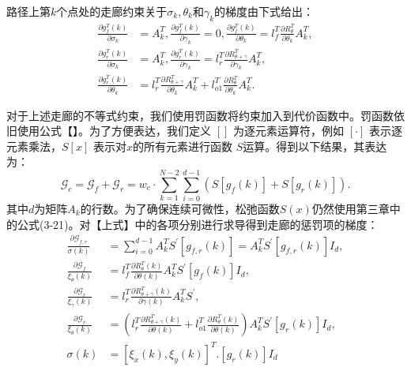 \documentclass[master,academic]{ysuthesis} %
\begin{document}
		路径上第$k$个点处的走廊约束关于$\sigma_k,\theta_k$和$\gamma_k$的梯度由下式给出：
		\begin{equation}
			\begin{aligned}
			\frac{\partial g_{f}^{T}(k)}{\partial \sigma _k}&=A_{k}^{T},\frac{\partial g_{f}^{T}(k)}{\partial \gamma _k}=0,\frac{\partial g_{f}^{T}(k)}{\partial \theta _k}=l_{f}^{T}\frac{\partial R_{\theta}^{T}}{\partial \theta _k}A_{k}^{T},\\
			\frac{\partial g_{r}^{T}(k)}{\partial \sigma _k}&=A_{k}^{T},\frac{\partial g_{r}^{T}(k)}{\partial \gamma _k}=l_{r}^{T}\frac{\partial R_{\theta +\gamma}^{T}}{\partial \gamma _k}A_{k}^{T},\\
			\frac{\partial g_{r}^{T}(k)}{\partial \theta _k}&=l_{r}^{T}\frac{\partial R_{\theta +\gamma}^{T}}{\partial \theta _k}A_{k}^{T}+l_{o1}^{T}\frac{\partial R_{\theta}^{T}}{\partial \theta _k}A_{k}^{T}.
			\end{aligned}
		\end{equation}

		对于上述走廊的不等式约束，我们使用罚函数将约束加入到代价函数中。罚函数依旧使用公式【】。为了方便表达，我们定义 \([]\) 为逐元素运算符，例如 \([\cdot]\) 表示逐元素乘法，\(S[x]\) 表示对$x$的所有元素进行函数 \(S\)运算。得到以下结果，其表达为：
		\begin{equation}
			\mathcal{G}_c =\mathcal{G}_{f}+\mathcal{G}_{r}=w_{c}\cdot \sum_{k=1}^{N-2}\sum_{i=0}^{d-1}(S[g_f(k)] + S[g_r(k)]).\label{20}
		\end{equation}
		其中$d$为矩阵$A_k$的行数。为了确保连续可微性，松弛函数$S(x)$仍然使用第三章中的公式(3-21)。对【上式】中的各项分别进行求导得到走廊的惩罚项的梯度：
		\begin{equation}
			\begin{aligned}
				\frac{\partial \mathcal{G}_{f,r}}{\sigma \left( k \right)}&=\sum_{i=0}^{d-1}{A}_{k}^{T}S^{'}\left[ g_{f,r}\left( k \right) \right] =A_{k}^{T}S^{'}\left[ g_{f,r}\left( k \right) \right] I_d,\\
				\frac{\partial \mathcal{G}_f}{\xi _{\theta}\left( k \right)}&=l_{f}^{T}\frac{\partial R_{\theta}^{T}\left( k \right)}{\partial \theta \left( k \right)}A_{k}^{T}S^{'}\left[ g_f\left( k \right) \right] I_d,\\
				\frac{\partial \mathcal{G}_r}{\xi _{\gamma}\left( k \right)}&=l_{r}^{T}\frac{\partial R_{\theta +\gamma}^{T}\left( k \right)}{\partial \gamma \left( k \right)}A_{k}^{T}S^{'},\\
				\frac{\partial \mathcal{G}_r}{\xi _{\theta}\left( k \right)}&=\left( l_{r}^{T}\frac{\partial R_{\theta +\gamma}^{T}\left( k \right)}{\partial \theta \left( k \right)}+l_{o1}^{T}\frac{\partial R_{\theta}^{T}\left( k \right)}{\partial \theta \left( k \right)} \right) A_{k}^{T}S^{'}\left[ g_r\left( k \right) \right] I_d,\\
				\sigma \left( k \right) &=\left[ \xi _x\left( k \right) ,\xi _y\left( k \right) \right] ^T.\left[ g_r\left( k \right) \right] I_d
			\end{aligned}
		\end{equation}
		
\end{document}
